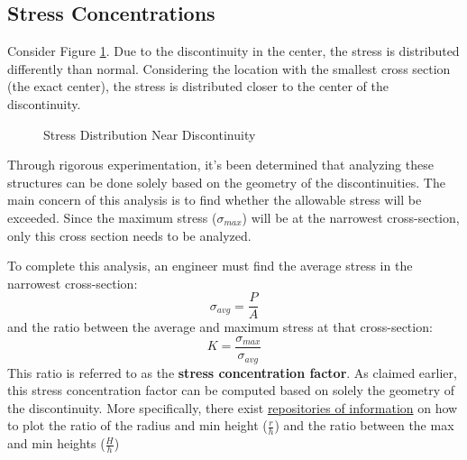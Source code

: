 \documentclass[12pt]{article}
\begin{document}
\subsection{Stress Concentrations}
\label{ssec:stressConcentrations}

Consider Figure \ref{fig:stressDistributionNearDiscontinuity}. Due to the discontinuity in the center, the stress is distributed differently than normal. Considering the location with the smallest cross section (the exact center), the stress is distributed closer to the center of the discontinuity.

\begin{figure}[H]
  \centering
  \begin{subfigure}[H]{0.48\textwidth}
    \centering
    
  \end{subfigure}
  \begin{subfigure}[H]{0.48\textwidth}
    \centering
    
  \end{subfigure}
  \caption{Stress Distribution Near Discontinuity}
  \label{fig:stressDistributionNearDiscontinuity}
\end{figure}

Through rigorous experimentation, it's been determined that analyzing these structures can be done solely based on the geometry of the discontinuities. The main concern of this analysis is to find whether the allowable stress will be exceeded. Since the maximum stress ($\sigma_{max}$) will be at the narrowest cross-section, only this cross section needs to be analyzed.

To complete this analysis, an engineer must find the average stress in the narrowest cross-section:
\begin{equation*}
  \sigma_{avg} = \frac{P}{A}
\end{equation*}
and the ratio between the average and maximum stress at that cross-section:
\begin{equation*}
  K = \frac{\sigma_{max}}{\sigma_{avg}}
\end{equation*}
This ratio is referred to as the \textbf{stress concentration factor}. As claimed earlier, this stress concentration factor can be computed based on solely the geometry of the discontinuity. More specifically, there exist \href{https://research.iaun.ac.ir/pd/jjfesharaki/pdfs/UploadFile_9038.pdf}{repositories of information} on how to plot the ratio of the radius and min height ($\frac{r}{h}$) and the ratio between the max and min heights ($\frac{H}{h}$)
\end{document}
